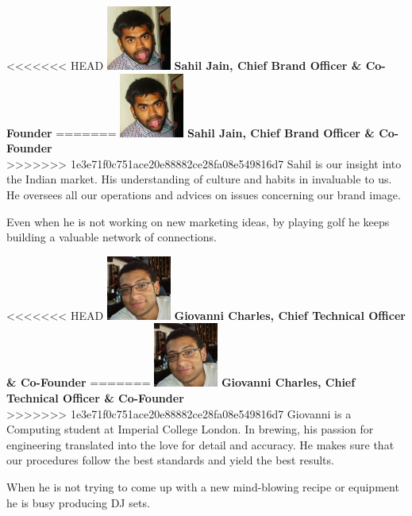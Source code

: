 \documentclass[11pt]{article}
\begin{document}
<<<<<<< HEAD
  \includegraphics[width=80px]{sahil.jpg} \textbf{Sahil Jain, Chief Brand Officer \& Co-Founder}
=======
  \includegraphics[width=80px]{sahil.jpg} \textbf{Sahil Jain, Chief Brand Officer \& Co-Founder}\\
>>>>>>> 1e3e71f0c751ace20e88882ce28fa08e549816d7
  Sahil is our insight into the Indian market.
  His understanding of culture and habits in invaluable to us.
  He oversees all our operations and advices on issues concerning our brand image.

  Even when he is not working on new marketing ideas, by playing golf he keeps building a valuable network of connections.

<<<<<<< HEAD
  \includegraphics[width=80px]{gio.jpg} \textbf{Giovanni Charles, Chief Technical Officer \& Co-Founder}
=======
  \includegraphics[width=80px]{gio.jpg} \textbf{Giovanni Charles, Chief Technical Officer \& Co-Founder}\\
>>>>>>> 1e3e71f0c751ace20e88882ce28fa08e549816d7
  Giovanni is a Computing student at Imperial College London.
  In brewing, his passion for engineering translated into the love for detail and accuracy.
  He makes sure that our procedures follow the best standards and yield the best results.

  When he is not trying to come up with a new mind-blowing recipe or equipment he is busy producing DJ sets.
\end{document}
